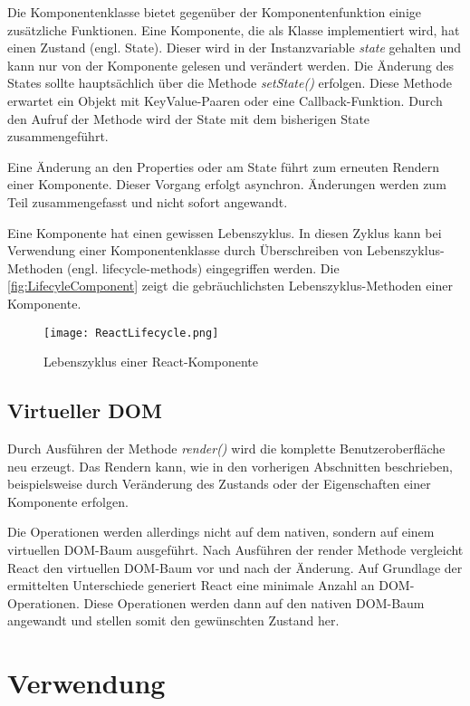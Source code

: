 Die Komponentenklasse bietet gegenüber der Komponentenfunktion einige zusätzliche Funktionen. Eine  Komponente, die als Klasse implementiert wird, hat einen Zustand (engl. State). Dieser wird in der Instanzvariable \textit{state} gehalten und kann nur von der Komponente gelesen und verändert werden. Die Änderung des States sollte hauptsächlich über die Methode \textit{setState()} erfolgen. Diese Methode  erwartet ein Objekt mit KeyValue-Paaren oder eine Callback-Funktion. Durch den Aufruf der Methode wird der State mit dem bisherigen State zusammengeführt.\autocites[vgl.][24\psq,89-93]{Zeigermann.2016}[vgl.][17\psq]{Stefanov.2017}

Eine Änderung an den Properties oder am State führt zum erneuten Rendern einer Komponente. Dieser Vorgang erfolgt asynchron. Änderungen werden zum Teil zusammengefasst und nicht sofort angewandt. \autocites[vgl.][24\psq, 90\psq]{Zeigermann.2016}


Eine Komponente hat einen gewissen Lebenszyklus. In diesen Zyklus kann bei Verwendung einer Komponentenklasse durch Überschreiben von Lebenszyklus-Methoden (engl. lifecycle-methods) eingegriffen werden. Die \autoref{fig:LifecyleComponent} zeigt die gebräuchlichsten Lebenszyklus-Methoden einer Komponente.\autocites[vgl.][96-100]{Zeigermann.2016}[vgl.][]{Facebook.2018b}


\begin{figure}
	\centering
	\texttt{[image: ReactLifecycle.png]}
	\caption{Lebenszyklus einer  React-Komponente} 
	\label{fig:LifecyleComponent}
\end{figure}



\subsection{Virtueller DOM}

Durch Ausführen der Methode \textit{render()} wird die komplette Benutzeroberfläche neu erzeugt. Das Rendern kann, wie in den vorherigen Abschnitten beschrieben, beispielsweise durch Veränderung des Zustands oder der Eigenschaften einer Komponente erfolgen.

Die Operationen werden allerdings nicht auf dem nativen, sondern auf einem virtuellen DOM-Baum ausgeführt. Nach Ausführen der render Methode vergleicht React den virtuellen DOM-Baum vor und nach der Änderung. Auf Grundlage der ermittelten Unterschiede generiert React eine minimale Anzahl an DOM-Operationen.  Diese Operationen werden dann auf den nativen DOM-Baum angewandt und stellen somit den gewünschten Zustand her. \autocites[vgl.][23\psq]{Zeigermann.2016}[vgl.][53\psq]{Stefanov.2017}[vgl.][]{Facebook.2018}



\section{Verwendung}


